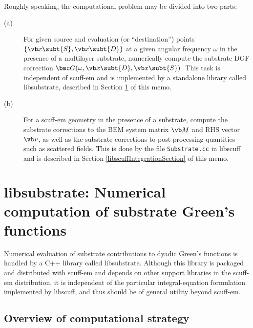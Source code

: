 \documentclass[letterpaper]{article}
\begin{document}
Roughly speaking, the computational problem may be divided into two parts:
\begin{description}
  \item[(a)] For given source and evaluation (or ``destination'')
             points $\{\vb x\subt{S}, \vb x\subt{D}\}$ at a given 
             angular frequency
             $\omega$ in the presence of a multilayer substrate,
             numerically compute the substrate DGF correction
             $\bmc G(\omega, \vb x\subt{D}, \vb x\subt{S})$.
             This task is independent of {\sc scuff-em}
             and is implemented by a standalone library
             called {\sc libsubstrate}, described in
             Section \ref{libSubstrateSection} of this memo.
  \item[(b)] For a {\sc scuff-em} geometry in the presence of a
             substrate, compute the substrate corrections to the BEM
             system matrix $\vb M$ and RHS vector $\vb v$,
             as well as the substrate corrections
             to post-processing quantities such as scattered fields.
             This is done by the file \texttt{Substrate.cc}
             in {\sc libscuff} and is described in 
             Section \ref{libscuffIntegrationSection} of this memo.
\end{description}

\newpage
\section{{\sc libsubstrate:} Numerical computation of substrate Green's functions}
\label{libSubstrateSection}

Numerical evaluation of substrate contributions to
dyadic Green's functions is handled by a C++ library 
called {\sc libsubstrate}.
Although this library is packaged and distributed with {\sc scuff-em}
and depends on other support libraries in the {\sc scuff-em}
distribution, it is independent of the particular integral-equation
formulation implemented by {\sc libscuff}, and thus should be
of general utility beyond {\sc scuff-em}.

\subsection{Overview of computational strategy}
\label{libSubstrateStrategy}
\end{document}
